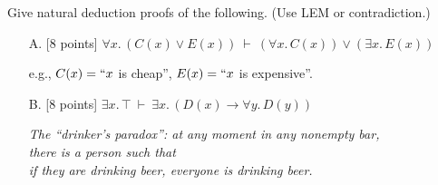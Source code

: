\documentclass[12pt,letterpaper,boxed,cm]{hmcpset}
\newcommand{\ra}[0]{\rightarrow}
\newcommand{\cp}[0]{~\vdash~}
\begin{document}
\begin{problem}[2.]
    [16 points] Give natural deduction proofs of the following. (Use LEM or contradiction.)
    \begin{enumerate}
        \item [A.] [8 points] $\forall x.\, (C(x) \lor E(x))\cp(\forall x.\,C(x)) \lor (\exists x.\,E(x))$
        \begin{flushright}
            e.g., $C(x) = ``x$ is cheap'', $E(x) = ``x$ is expensive''.   
        \end{flushright}
        \item [B.] [8 points] $\exists x.\,\top  \cp  \exists x.\,(D(x) \ra \forall y.\,D(y))$
        \begin{flushright}
            \emph{The ``drinker’s paradox'': at any moment in any nonempty bar,\\
                        there is a person such that \\
                        if they are drinking beer, everyone is drinking beer.}
        \end{flushright}
    \end{enumerate}
\end{problem}

\begin{solution}
    \vfill
\end{solution}
\newpage
\end{document}
